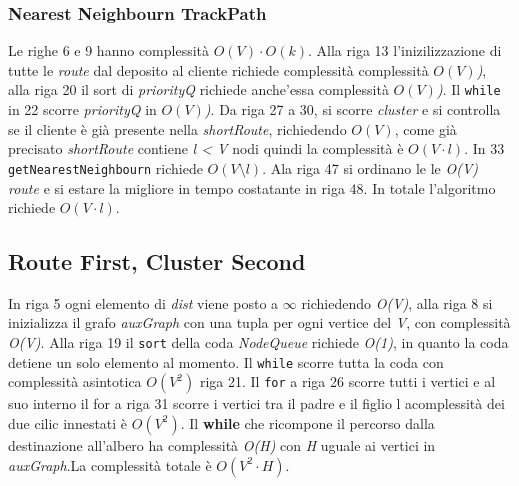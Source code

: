 \documentclass[]{article}
\begin{document}
\subsubsection{Nearest Neighbourn TrackPath}
Le righe 6 e 9 hanno complessità \emph{$O(V) \cdot O(k)$}. Alla riga 13 l'inizilizzazione di tutte le \emph{route} dal deposito al cliente richiede complessità complessità \emph{$O(V)$)}, alla riga  20 il sort di \textit{priorityQ} richiede anche'essa complessità \emph{$O(V)$)}. Il \texttt{while} in 22 scorre \textit{priorityQ} in  \emph{$O(V)$)}.
Da riga 27 a 30, si scorre \textit{cluster} e si controlla se il cliente è già presente nella \emph{shortRoute},  richiedendo   \emph{$O(V)$}, come già precisato \emph{shortRoute} contiene \emph{l < V} nodi quindi la complessità  è \emph{$O(V \cdot l)$}. In 33 \texttt{getNearestNeighbourn} richiede \emph{$O(V \setminus l)$}. Ala riga 47 si ordinano le le \emph{O(V)} \emph{route} e si estare la migliore in tempo costatante in riga 48. In totale l'algoritmo richiede \emph{$O(V \cdot l)$}.


\subsection{Route First, Cluster Second}
In riga 5 ogni elemento di \textit{dist} viene posto a $\infty$ richiedendo \emph{O(V)}, alla riga 8 si inizializza il grafo \textit{auxGraph} con una tupla per ogni vertice del \emph{V}, con complessità \emph{O(V)}. Alla riga 19 il \texttt{sort} della coda \textit{NodeQueue} richiede \emph{O(1)}, in quanto la coda detiene un solo elemento al momento.
Il \texttt{while} scorre tutta la coda con complessità asintotica \emph{$O(V^2)$} riga 21. Il \texttt{for} a riga 26 scorre tutti i vertici e al suo interno il for a riga 31 scorre i vertici tra il padre e il figlio l acomplessità dei due cilic innestati è \emph{$O(V^2)$}. Il \textbf{while} che ricompone il percorso dalla destinazione all'albero ha complessità \emph{O(H)} con \emph{H} uguale ai vertici in \textit{auxGraph}.La complessità totale è \emph{$O(V^2 \cdot H)$}.
\end{document}
